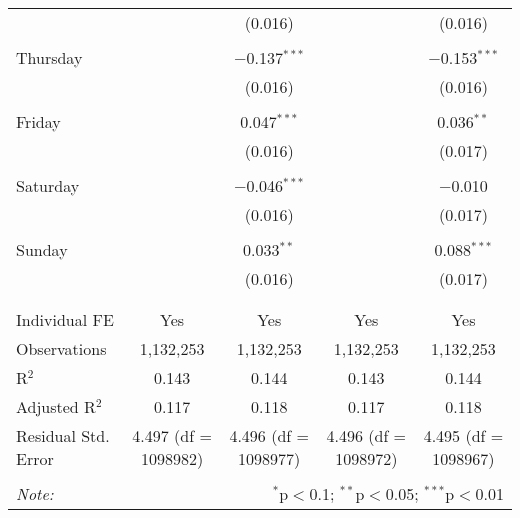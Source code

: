 \documentclass[
]{article}
\begin{document}
\begin{table}[!htbp]
{\begin{tabular}{@{\extracolsep{5pt}}lcccc}
  &  & (0.016) &  & (0.016) \\ 
  & & & & \\ 
 Thursday &  & $-$0.137$^{***}$ &  & $-$0.153$^{***}$ \\ 
  &  & (0.016) &  & (0.016) \\ 
  & & & & \\ 
 Friday &  & 0.047$^{***}$ &  & 0.036$^{**}$ \\ 
  &  & (0.016) &  & (0.017) \\ 
  & & & & \\ 
 Saturday &  & $-$0.046$^{***}$ &  & $-$0.010 \\ 
  &  & (0.016) &  & (0.017) \\ 
  & & & & \\ 
 Sunday &  & 0.033$^{**}$ &  & 0.088$^{***}$ \\ 
  &  & (0.016) &  & (0.017) \\ 
  & & & & \\ 
\hline \\[-1.8ex] 
Individual FE & Yes & Yes & Yes & Yes \\ 
Observations & 1,132,253 & 1,132,253 & 1,132,253 & 1,132,253 \\ 
R$^{2}$ & 0.143 & 0.144 & 0.143 & 0.144 \\ 
Adjusted R$^{2}$ & 0.117 & 0.118 & 0.117 & 0.118 \\ 
Residual Std. Error & 4.497 (df = 1098982) & 4.496 (df = 1098977) & 4.496 (df = 1098972) & 4.495 (df = 1098967) \\ 
\hline 
\hline \\[-1.8ex] 
\textit{Note:}  & \multicolumn{4}{r}{$^{*}$p$<$0.1; $^{**}$p$<$0.05; $^{***}$p$<$0.01} \\ 
\end{tabular}
} 
\end{table}
\end{document}
